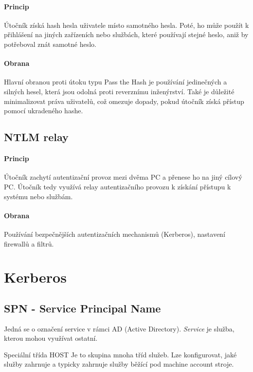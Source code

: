 \documentclass[10pt,a4paper]{article}
\begin{document}
\paragraph{Princip}
Útočník získá hash hesla uživatele místo samotného hesla. 
Poté, ho může použít k přihlášení na jiných zařízeních nebo službách, které používají stejné heslo, aniž by potřeboval znát samotné heslo.

\paragraph{Obrana} Hlavní obranou proti útoku typu Pass the Hash je používání jedinečných a silných hesel, která jsou odolná proti reverznímu inženýrství. 
Také je důležité minimalizovat práva uživatelů, což omezuje dopady, pokud útočník získá přístup pomocí ukradeného hashe.

\subsection{NTLM relay}

\paragraph{Princip} Útočník zachytí autentizační provoz mezi dvěma PC a přenese ho na jiný cílový PC. 
Útočník tedy využívá relay autentizačního provozu k získání přístupu k systému nebo službám. 

\paragraph{Obrana} Používání bezpečnějších autentizačních mechanismů (Kerberos), nastavení firewallů a filtrů.

\section{Kerberos}

\subsection{SPN - Service Principal Name}
Jedná se o označení service v rámci AD (Active Directory). \textit{Service} je služba, kterou mohou využívat ostatní. 

Speciální třída HOST
Je to skupina mnoha tříd služeb. Lze konfigurovat, jaké služby zahrnuje a typicky zahrnuje služby běžící pod machine account stroje.
\end{document}
